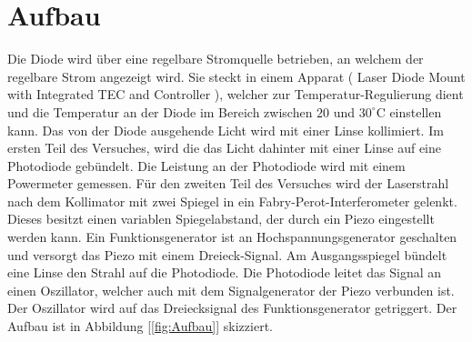 \documentclass[a4paper,10pt]{scrartcl} %
\begin{document}
\section{Aufbau}
\label{sec:Aufbau}
Die Diode wird über eine regelbare Stromquelle betrieben, an welchem der regelbare Strom angezeigt wird. Sie steckt in einem Apparat ( Laser Diode Mount with Integrated TEC and Controller \cite{Mount}), welcher zur Temperatur-Regulierung dient und die Temperatur an der Diode im Bereich zwischen $20$ und $30^\circ{\text{C}}$ einstellen kann. Das von der Diode ausgehende Licht wird mit einer Linse kollimiert. Im ersten Teil des Versuches, wird die das Licht dahinter mit einer Linse auf eine Photodiode gebündelt. Die Leistung an der Photodiode wird mit einem Powermeter gemessen. Für den zweiten Teil des Versuches wird der Laserstrahl nach dem Kollimator mit zwei Spiegel in ein Fabry-Perot-Interferometer gelenkt. Dieses besitzt einen variablen Spiegelabstand, der durch ein Piezo eingestellt werden kann. Ein Funktionsgenerator ist an Hochspannungsgenerator geschalten und versorgt das Piezo mit einem Dreieck-Signal. Am Ausgangsspiegel bündelt eine Linse den Strahl auf die Photodiode. Die Photodiode leitet das Signal an einen Oszillator, welcher auch mit dem Signalgenerator der Piezo verbunden ist. Der Oszillator wird auf das Dreiecksignal des Funktionsgenerator getriggert. Der Aufbau ist in Abbildung [\ref{fig:Aufbau}] skizziert.
\end{document}
